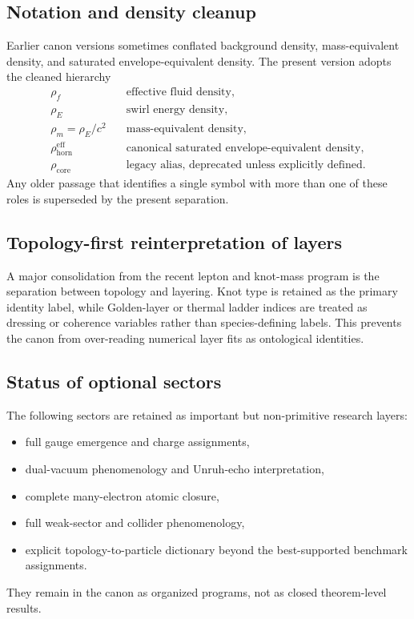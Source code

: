 \documentclass[11pt]{article}
\theoremstyle{definition}
\theoremstyle{plain}
\theoremstyle{remark}
\newcommand{\rhoF}{{\rho_{\!f}}}
\newcommand{\rhoE}{\rho_{\!E}}
\newcommand{\rhoM}{\rho_{\!m}}
\newcommand{\rhocore}{\rho_{\mathrm{core}}}
\newcommand{\rhohorn}{\rho_{\mathrm{horn}}^{\mathrm{eff}}}
\begin{document}
    \subsection{Notation and density cleanup}
        Earlier canon versions sometimes conflated background density, mass-equivalent density, and saturated envelope-equivalent density. The present version adopts the cleaned hierarchy
        \begin{align}
            \rhoF
            &\quad \text{effective fluid density},
            \nonumber\\
            \rhoE
            &\quad \text{swirl energy density},
            \nonumber\\
            \rhoM = \rhoE/c^2
            &\quad \text{mass-equivalent density},
            \nonumber\\
            \rhohorn
            &\quad \text{canonical saturated envelope-equivalent density},
            \nonumber\\
            \rhocore
            &\quad \text{legacy alias, deprecated unless explicitly defined}.
            \label{eq:density_symbol_roles}
        \end{align}
        Any older passage that identifies a single symbol with more than one of these roles is superseded by the present separation.

    \subsection{Topology-first reinterpretation of layers}
        A major consolidation from the recent lepton and knot-mass program is the separation between topology and layering. Knot type is retained as the primary identity label, while Golden-layer or thermal ladder indices are treated as dressing or coherence variables rather than species-defining labels. This prevents the canon from over-reading numerical layer fits as ontological identities.

    \subsection{Status of optional sectors}
        The following sectors are retained as important but non-primitive research layers:
        \begin{itemize}
            \item full gauge emergence and charge assignments,
            \item dual-vacuum phenomenology and Unruh-echo interpretation,
            \item complete many-electron atomic closure,
            \item full weak-sector and collider phenomenology,
            \item explicit topology-to-particle dictionary beyond the best-supported benchmark assignments.
        \end{itemize}
        They remain in the canon as organized programs, not as closed theorem-level results.
\end{document}
